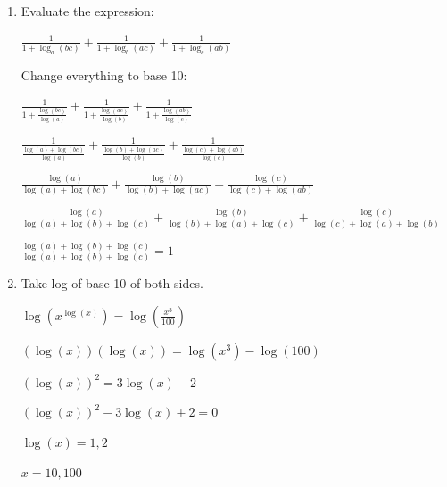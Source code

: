 \documentclass[../main.tex]{subfiles}
\begin{document}
\begin{enumerate}[itemsep=0.4cm]
    $\frac{x+y}{x-y}=8$

    $x+y=8x-8y$

    $9y=7x$

    $y=\frac{7x}{9}$

    Substitute into equation 1:

    \(\log_{10}(x^2+(\frac{7x}{9})^2)=1+\log_{10}(13)\)

    \(\log_{10}\Bigl(x^2+(\frac{49x^2}{81})\Bigr)=1+\log_{10}(13)\)

    $\log_{10}\Bigl(\frac{130x^2}{81}\Bigr)=\log_{10}(10)+\log_{10}(13)$

    $\log_{10}\Bigl(\frac{130x^2}{81}\Bigr)=\log_{10}(130)$

    $\frac{130x^2}{81}=130$

    $\frac{x^2}{81}=1$

    $x^2=81$

    $x=\pm 9$

    Substitute into $y=\frac{7x}{9}$

    $y=7, -7$

    Solutions are $x=9, y=7$ and $x=-9, y=-7$

    However, we can't have a negative solution as $\log_{10}(-9--7)$ is undefined.

    Therefore, $x=9, y=7$


    \item 
    Evaluate the expression:

    \(\frac{1}{1+\log_a(bc)}+\frac{1}{1+\log_b(ac)}+\frac{1}{1+\log_c(ab)} \)

    Change everything to base 10:

    $\frac{1}{1+\frac{\log(bc)}{\log(a)}}+\frac{1}{1+\frac{\log(ac)}{\log(b)}}+\frac{1}{1+\frac{\log(ab)}{\log(c)}}$

    $\frac{1}{\frac{\log(a)+\log(bc)}{\log(a)}}+\frac{1}{\frac{\log(b)+\log(ac)}{\log(b)}}+\frac{1}{\frac{\log(c)+\log(ab)}{\log(c)}}$

    $\frac{\log(a)}{\log(a)+\log(bc)}+\frac{\log(b)}{\log(b)+\log(ac)}+\frac{\log(c)}{\log(c)+\log(ab)}$

    $\frac{\log(a)}{\log(a)+\log(b)+\log(c)}+\frac{\log(b)}{\log(b)+\log(a)+\log(c)}+\frac{\log(c)}{\log(c)+\log(a)+\log(b)}$

    $\frac{\log(a)+\log(b)+\log(c)}{\log(a)+\log(b)+\log(c)}=1$

    \item 
    Take log of base 10 of both sides.

    $\log(x^{\log(x)})=\log(\frac{x^3}{100})$

    $(\log(x))(\log(x))=\log(x^3)-\log(100)$

    $(\log(x))^2=3\log(x)-2$

    $(\log(x))^2-3\log(x)+2=0$

    $\log(x)=1, 2$

    $x=10, 100$





\end{enumerate}
\end{document}
